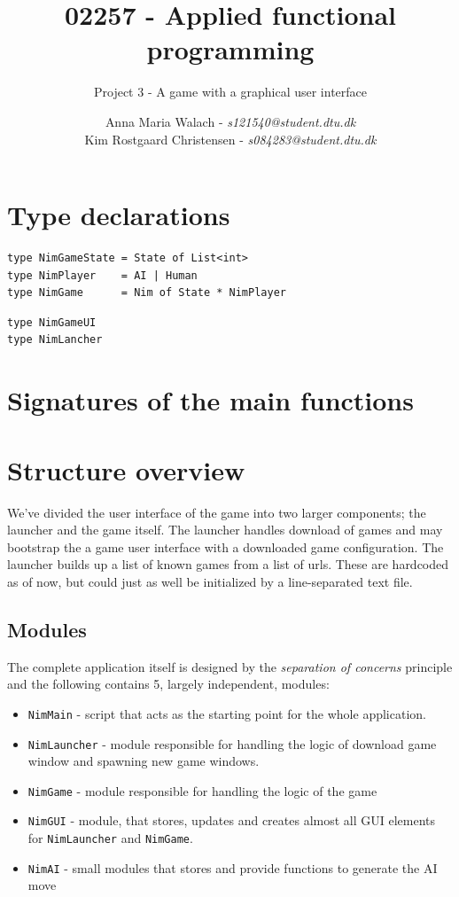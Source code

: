 \documentclass[10pt]{scrartcl}
\title{02257 - Applied functional programming}
\subtitle{Project 3 - A game with a graphical user interface}
\author{Anna Maria Walach - \textit {s121540@student.dtu.dk} \\ Kim Rostgaard Christensen - \textit {s084283@student.dtu.dk}}
\begin{document}
\maketitle
\section{Type declarations}
\begin{lstlisting}
type NimGameState = State of List<int>
type NimPlayer    = AI | Human
type NimGame      = Nim of State * NimPlayer
\end{lstlisting}

\begin{lstlisting}
type NimGameUI
type NimLancher
\end{lstlisting}

\section{Signatures of the main functions}

\section{Structure overview}
We've divided the user interface of the game into two larger components; the launcher and the game itself. The launcher handles download of games and may bootstrap the a game user interface with a downloaded game configuration. The launcher builds up a list of known games from a list of urls. These are hardcoded as of now, but could just as well be initialized by a line-separated text file.
\subsection{Modules}
The complete application itself is designed by the \emph{separation of concerns} principle and the following contains 5, largely independent, modules:
\begin{itemize}
  \item \texttt{NimMain} - script that acts as the starting point for the whole application.
  \item \texttt{NimLauncher} - module responsible for handling the logic of download game window and spawning new game windows.
  \item \texttt{NimGame} - module responsible for handling the logic of the game
  \item \texttt{NimGUI} - module, that stores, updates and creates almost all GUI elements for \texttt{NimLauncher} and \texttt{NimGame}.
  \item \texttt{NimAI} - small modules that stores and provide functions to generate the AI move
\end{itemize}
\end{document}
